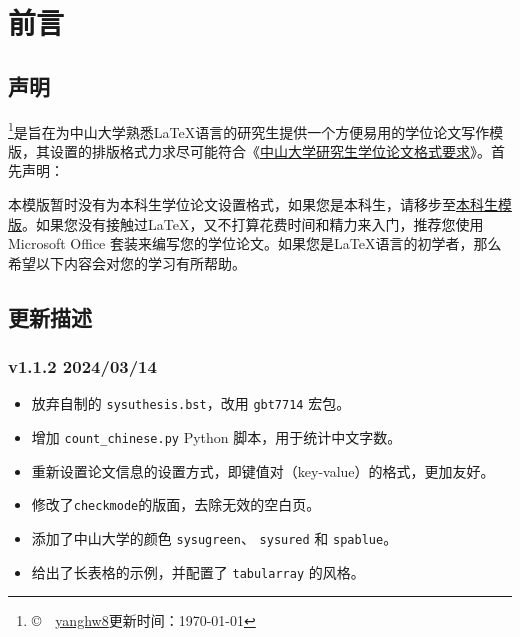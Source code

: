 \chapter{前\hspace*{1\ccwd}言}

\section{声明}

\sysuthesis{}\footnote{\copyright~\number\year~\href{https://github.com/yanghw8}{yanghw8}\hspace*{2\ccwd}更新时间：\today}是旨在为中山大学熟悉\LaTeX{}语言的研究生提供一个方便易用的学位论文写作模版，其设置的排版格式力求尽可能符合《\href{https://graduate.sysu.edu.cn/sites/graduate.prod.dpcms4.sysu.edu.cn/files/2019-04/%E4%B8%AD%E5%B1%B1%E5%A4%A7%E5%AD%A6%E7%A0%94%E7%A9%B6%E7%94%9F%E5%AD%A6%E4%BD%8D%E8%AE%BA%E6%96%87%E6%A0%BC%E5%BC%8F%E8%A6%81%E6%B1%82.pdf}{中山大学研究生学位论文格式要求}》。首先声明：

本模版暂时没有为本科生学位论文设置格式，如果您是本科生，请移步至\href{https://github.com/SYSU-SCC/sysu-thesis}{本科生模版}。如果您没有接触过\LaTeX{}，又不打算花费时间和精力来入门，推荐您使用 Microsoft Office 套装来编写您的学位论文。如果您是\LaTeX{}语言的初学者，那么希望以下内容会对您的学习有所帮助。

\section{更新描述}

\subsection*{v1.1.2 2024/03/14}
\begin{itemize}
    \item 放弃自制的 \texttt{sysuthesis.bst}，改用 \texttt{gbt7714} 宏包。
    \item 增加  \texttt{count\_chinese.py} Python 脚本，用于统计中文字数。
    \item 重新设置论文信息的设置方式，即键值对（key-value）的格式，更加友好。
    \item 修改了\texttt{checkmode}的版面，去除无效的空白页。
    \item 添加了中山大学的颜色 \texttt{sysugreen}、 \texttt{sysured} 和 \texttt{spablue}。
    \item 给出了长表格的示例，并配置了 \texttt{tabularray} 的风格。
\end{itemize}

